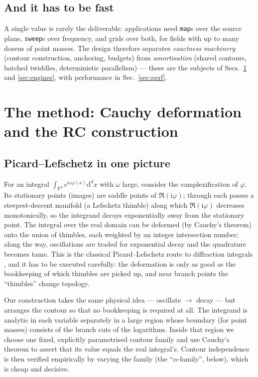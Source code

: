 \documentclass[11pt,a4paper]{article}
\newcommand{\ii}{\mathrm{i}}
\newcommand{\dd}{\mathrm{d}}
\newcommand{\R}{\mathbb{R}}
\begin{document}
\subsection{And it has to be fast}

A single value is rarely the deliverable: applications need
\texttt{map}s over the source plane, \texttt{sweep}s over frequency, and
grids over both, for fields with up to many dozens of point masses.  The
design therefore separates \emph{exactness machinery} (contour construction,
anchoring, budgets) from \emph{amortisation} (shared contours, batched
twiddles, deterministic parallelism) --- these are the subjects of
Secs.~\ref{sec:method} and \ref{sec:engines}, with performance in
Sec.~\ref{sec:perf}.

\section{The method: Cauchy deformation and the RC construction}
\label{sec:method}

\subsection{Picard--Lefschetz in one picture}

For an integral $\int_{\R^d} e^{\ii\omega\varphi(x)}\dd^dx$ with $\omega$
large, consider the complexification of $\varphi$.  Its stationary points
(images) are saddle points of $\Re(\ii\varphi)$; through each passes a
steepest-descent manifold (a Lefschetz thimble) along which
$\Re(\ii\varphi)$ decreases monotonically, so the integrand decays
exponentially away from the stationary point.  The integral over the real
domain can be deformed (by Cauchy's theorem) onto the union of thimbles,
each weighted by an integer intersection number; along the way, oscillations
are traded for exponential decay and the quadrature becomes tame.  This is
the classical Picard--Lefschetz route to diffraction integrals
\cite{Feldbrugge2019,Jow2021,Shi2024}, and it has to be executed carefully:
the deformation is only as good as the bookkeeping of which thimbles are
picked up, and near branch points the ``thimbles'' change topology.

Our construction takes the same physical idea --- oscillate $\to$ decay ---
but arranges the contour so that no bookkeeping is required at all.  The
integrand is analytic in each variable separately in a large region whose
boundary (for point masses) consists of the branch cuts of the logarithms.
Inside that region we choose one fixed, explicitly parametrised contour
family and use Cauchy's theorem to assert that its value equals the real
integral's.  Contour independence is then verified empirically by varying
the family (the ``$\alpha$-family'', below), which is cheap and decisive.
\end{document}
